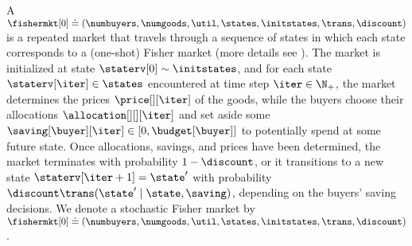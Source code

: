 


A  $\fishermkt[0] \doteq (\numbuyers, \numgoods, \util, \states, \initstates, \trans, \discount)$ is a repeated market that travels through a sequence of states in which each state corresponds to a (one-shot) Fisher market (more details see ).
The market is initialized at state $\staterv[0] \sim \initstates$, and for each state $\staterv[\iter] \in \states$ encountered at time step $\iter \in \N_+$, the market determines the prices $\price[][\iter]$ of the goods, while the buyers choose their allocations $\allocation[][][\iter]$ and set aside some  $\saving[\buyer][\iter] \in [0, \budget[\buyer]]$ to potentially spend at some future state.
Once allocations, savings, and prices have been determined, the market terminates with probability $1-\discount$, or it transitions to a new state $\staterv[\iter + 1] = \state^\prime$ with probability $\discount \trans(\state^\prime \mid \state, \saving)$, depending on the buyers' saving decisions.%
We denote a stochastic Fisher market by $\fishermkt[0] \doteq (\numbuyers, \numgoods, \util, \states, \initstates, \trans, \discount)$.

